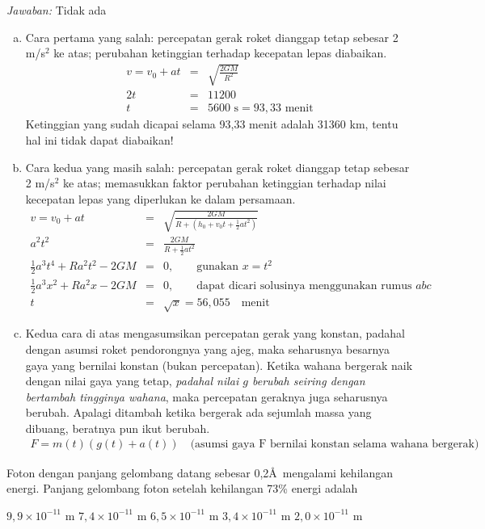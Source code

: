 \documentclass[11pt,fleqn]{exam}
\begin{document}
\begin{questions}
\textit{Jawaban: } Tidak ada

\begin{enumerate}[a)]
\item Cara pertama yang salah: percepatan gerak roket dianggap tetap sebesar 2 m/s$^2$ ke atas; perubahan ketinggian terhadap kecepatan lepas diabaikan.
\begin{eqnarray*}
v = v_0 + at &=& \sqrt{\frac{2GM}{R^2}}\\
2t &=& 11200\\
t &=& 5600\text{   s} = 93,33 \text{  menit}
\end{eqnarray*}
Ketinggian yang sudah dicapai selama 93,33 menit adalah 31360 km, tentu hal ini tidak dapat diabaikan!

\item Cara kedua yang masih salah: percepatan gerak roket dianggap tetap sebesar 2 m/s$^2$ ke atas; memasukkan faktor perubahan ketinggian terhadap nilai kecepatan lepas yang diperlukan ke dalam persamaan.
\begin{eqnarray*}
v = v_0 + at &=& \sqrt{\frac{2GM}{R+(h_0 + v_0 t + \frac{1}{2} a t^2)}}\\
a^2 t^2 &=& \frac{2GM}{R + \frac{1}{2} a t^2}\\
\frac{1}{2} a^3 t^4 + R a^2 t^2 - 2GM &=& 0, \qquad \text{gunakan  } x = t^2\\
\frac{1}{2} a^3 x^2 + R a^2 x - 2GM &=& 0, \qquad \text{dapat dicari solusinya menggunakan rumus } abc\\
t &=& \sqrt{x} = 56,055 \quad \text{menit}
\end{eqnarray*}

\item Kedua cara di atas mengasumsikan percepatan gerak yang konstan, padahal dengan asumsi roket pendorongnya yang ajeg, maka seharusnya besarnya gaya yang bernilai konstan (bukan percepatan). Ketika wahana bergerak naik dengan nilai gaya yang tetap, \textit{padahal nilai $g$ berubah seiring dengan bertambah tingginya wahana}, maka percepatan geraknya juga seharusnya berubah. Apalagi ditambah ketika bergerak ada sejumlah massa yang dibuang, beratnya pun ikut berubah.
\begin{eqnarray*}
F = m(t) (g(t) + a(t)) \quad \text{(asumsi gaya F bernilai konstan selama wahana bergerak)}
\end{eqnarray*}

\end{enumerate}



\vspace{0.3cm}
\question Foton dengan panjang gelombang datang sebesar 0,2\AA~mengalami kehilangan energi. Panjang gelombang foton setelah kehilangan 73\% energi adalah
\begin{choices}
\choice $9,9\times 10^{-11}$ m
\choice $7,4\times 10^{-11}$ m
\choice $6,5\times 10^{-11}$ m
\choice $3,4\times 10^{-11}$ m
\choice $2,0\times 10^{-11}$ m
\end{choices}


\end{questions}
\end{document}

